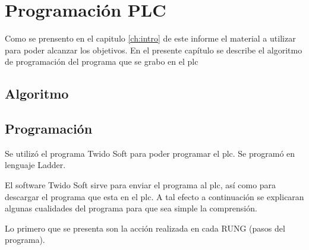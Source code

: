 \chapter{Programación PLC}
\label{ch:progPLC}
Como se prensento en el capitulo \ref{ch:intro} de este informe el material a utilizar
para poder alcanzar los objetivos. En el presente capítulo se describe el algoritmo 
de programación del programa que se grabo en el \gls{plc} 
\section{Algoritmo}
\label{sec:Algoritmo}





\section{Programación}
\label{sec:Programacion}
Se utilizó el programa Twido Soft para poder programar el \gls{plc}. Se programó
en lenguaje Ladder.

El software Twido Soft sirve para enviar el programa al \gls{plc}, así como 
para descargar el programa que esta en el \gls{plc}. A tal efecto a continuación 
se explicaran algunas cualidades del programa para que sea simple la comprensión.

Lo primero que se presenta son la acción realizada en cada RUNG (pasos del programa).

